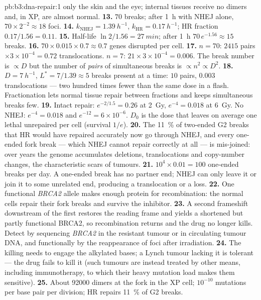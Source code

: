 \begin{solution}{pb:b3:dna-repair:1}
only the skin and the eye; internal tissues receive no dimers and, in
XP, are almost normal.
\textbf{13.} $70$ breaks; after \qty{1}{h} with NHEJ alone, $70\times
2^{-2} \approx 18$ foci.
\textbf{14.} $k_{\text{NHEJ}} = \qty{1.39}{h^{-1}}$, $k_{\text{HR}} =
\qty{0.17}{h^{-1}}$; HR fraction $0.17/1.56 = 0.11$.
\textbf{15.} Half-life $\ln 2/1.56 = \qty{27}{min}$; after \qty{1}{h}
$70\,e^{-1.56} \approx 15$ breaks.
\textbf{16.} $70\times 0.015\times 0.7 \approx 0.7$ genes disrupted per
cell.
\textbf{17.} $n = 70$: $2415$ pairs $\times 3\times 10^{-4} = 0.72$
translocations. $n = 7$: $21\times 3\times 10^{-4} = 0.006$. The break
number is $\propto D$ but the number of \emph{pairs} of simultaneous
breaks is $\propto n^{2} \propto D^{2}$.
\textbf{18.} $D = \qty{7}{h^{-1}}$, $L^{*} = 7/1.39 \approx 5$ breaks
present at a time: $10$ pairs, $0.003$ translocations --- two hundred
times fewer than the same dose in a flash. Fractionation lets normal
tissue repair between fractions and keeps simultaneous breaks few.
\textbf{19.} Intact repair: $e^{-2/1.5} = 0.26$ at \qty{2}{Gy},
$e^{-4} = 0.018$ at \qty{6}{Gy}. No NHEJ: $e^{-4} = 0.018$ and
$e^{-12} = 6\times 10^{-6}$. $D_{0}$ is the dose that leaves on average
one lethal unrepaired  per cell (survival $1/e$).
\textbf{20.} The \qty{11}{\%} of two-ended G2 breaks that HR would have
repaired accurately now go through NHEJ, and every one-ended fork
break --- which NHEJ cannot repair correctly at all --- is mis-joined:
over years the genome accumulates deletions, translocations and
copy-number changes, the characteristic scars of \emph{} tumours.
\textbf{21.} $10^{4}\times 0.01 = 100$ one-ended breaks per day. A
one-ended break has no partner end; NHEJ can only leave it or join it
to some unrelated end, producing a translocation or a loss.
\textbf{22.} One functional \emph{BRCA2} allele makes enough protein for
recombination: the normal cells repair their fork breaks and survive
the inhibitor.
\textbf{23.} A second frameshift downstream of the first restores the
reading frame and yields a shortened but partly functional BRCA2, so
recombination returns and the drug no longer kills. Detect by
sequencing \emph{BRCA2} in the resistant tumour or in circulating
tumour DNA, and functionally by the reappearance of  foci after
irradiation.
\textbf{24.} The killing needs  to engage the alkylated
bases; a Lynch tumour lacking it is tolerant --- the drug fails to kill
it (such tumours are instead treated by other means, including
immunotherapy, to which their heavy mutation load makes them
sensitive).
\textbf{25.} About \num{92000} dimers at the fork in the XP cell;
$10^{-10}$ mutations per base pair per division; HR repairs
\qty{11}{\%} of G2 breaks.
\end{solution}
